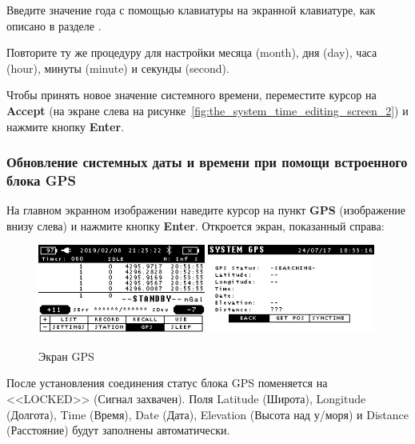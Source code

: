 Введите значение года с помощью клавиатуры на экранной клавиатуре, как
описано в разделе .

Повторите ту же процедуру для настройки месяца (month), дня (day), часа (hour),
минуты (minute) и секунды (second).

Чтобы принять новое значение системного времени, переместите курсор на
\textbf{Accept}
(на экране слева на рисунке~\ref{fig:the_system_time_editing_screen_2}) и
нажмите кнопку \textbf{Enter}.

\subsubsection{Обновление системных даты и времени при помощи встроенного блока
  GPS}

На главном экранном изображении наведите курсор на пункт \textbf{GPS} (изображение
внизу слева) и нажмите кнопку \textbf{Enter}. Откроется экран, показанный справа:

\begin{figure}[H]
  \centering
  \includegraphics[width=0.49\textwidth]{figures/the_gps_screen_1}
  \includegraphics[width=0.49\textwidth]{figures/the_gps_screen_2}
  \caption{Экран GPS}
  \label{fig:the_gps_screen_1}
\end{figure}


После установления соединения статус блока GPS поменяется на <<LOCKED>> (Сигнал
захвачен). Поля Latitude (Широта), Longitude (Долгота), Time (Время), Date
(Дата), Elevation (Высота над у/моря) и Distance (Расстояние) будут заполнены
автоматически.

